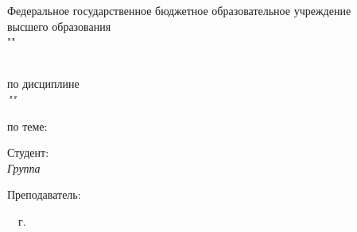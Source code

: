 \thispagestyle{empty}

\begin{center}
  \MakeUppercase{\cfgMinistry}

  \vspace{14pt}

  Федеральное государственное бюджетное образовательное учреждение\\
  высшего образования\\
  "\cfgUniversity"

  \vspace{14pt}

  \cfgDepartment
\end{center}

\vfill

\begin{center}
  \MakeUppercase{\cfgReportType}\\
  по дисциплине\\
  \textit{"\cfgDiscipline"
}

  \vspace{20pt}

  по теме:\\
  {\large\MakeUppercase{\cfgTopic}}
\end{center}

\vfill

\noindent Студент:\\
\textit{Группа~\cfgGroup \hfill \cfgStudentShort}

\vspace{14pt}

\noindent Преподаватель:\\
\textit{\cfgTeacherRank \hfill \cfgTeacherShort}

\vfill

\begin{center}
  \cfgCity~\cfgYear~г.
\end{center}
\newpage
